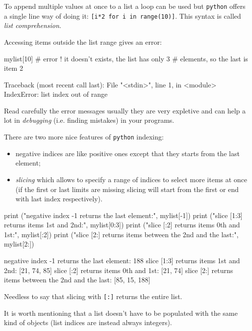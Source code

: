 To append multiple values at once to a list a loop can be used but \texttt{python} offers a single line way of doing it: \texttt{[i*2 for i in range(10)]}. This syntax is called \emph{list comprehension}.

Accessing items outside the list range gives an error:

\begin{ipython}
mylist[10] # error ! it doesn't exists, the list has only 3
           # elements, so the last is item 2
\end{ipython}
\begin{ioutput}
Traceback (most recent call last):
  File "<stdin>", line 1, in <module>
IndexError: list index out of range
\end{ioutput}

Read carefully the error messages usually they are very expletive and can help a lot in \emph{debugging} (i.e. finding mistakes) in your programs.

There are two more nice features of \texttt{python} indexing:

\begin{itemize}
\tightlist
\item negative indices are like positive ones except that they starts from the last element;
\item \emph{slicing} which allows to specify a range of indices to select more items at once (if the first or last limits are missing slicing will start from the first or end with last index respectively).
\end{itemize}

\begin{ipython}
print ("negative index -1 returns the last element:", mylist[-1])
print ("slice [1:3] returns items 1st and 2nd:", mylist[0:3])
print ("slice [:2] returns items 0th and 1st:", mylist[:2])
print ("slice [2:] returns items between the 2nd and the last:", mylist[2:])
\end{ipython}
\begin{ioutput}
negative index -1 returns the last element: 188
slice [1:3] returns items 1st and 2nd: [21, 74, 85]
slice [:2] returns items 0th and 1st: [21, 74]
slice [2:] returns items between the 2nd and the last: [85, 15, 188]
\end{ioutput}
\noindent
Needless to say that slicing with \texttt{[:]} returns the entire list.

It is worth mentioning that a list doesn't have to be populated with the same kind of objects (list indices are instead always integers).


